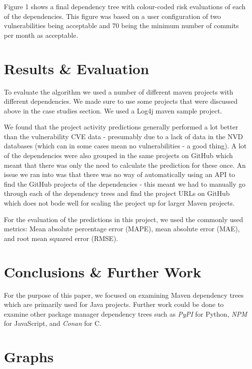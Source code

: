 \documentclass[10pt, compsoc, conference]{IEEEtran}
\begin{document}
Figure 1 shows a final dependency tree with colour-coded risk evaluations of each of the dependencies. This figure was based on a user configuration of two vulnerabilities being acceptable and 70 being the minimum number of commits per month as acceptable. 


\section{Results \& Evaluation}
To evaluate the algorithm we used a number of different maven projects with different dependencies. We made sure to use some projects that were discussed above in the case studies section. We used a Log4j maven sample project. 

We found that the project activity predictions generally performed a lot better than the vulnerability CVE data - presumably due to a lack of data in the NVD databases (which can in some cases mean no vulnerabilities - a good thing). A lot of the dependencies were also grouped in the same projects on GitHub which meant that there was only the need to calculate the prediction for these once. An issue we ran into was that there was no way of automatically using an API to find the GitHub projects of the dependencies - this meant we had to manually go through each of the dependency trees and find the project URLs on GitHub which does not bode well for scaling the project up for larger Maven projects. 

For the evaluation of the predictions in this project, we used the commonly used metrics: Mean absolute percentage error (MAPE), mean absolute error (MAE), and root mean squared error (RMSE). 

\section{Conclusions \& Further Work}
For the purpose of this paper, we focused on examining Maven dependency trees which are primarily used for Java projects. Further work could be done to examine other package manager dependency trees such as \textit{PyPI} for Python, \textit{NPM} for JavaScript, and \textit{Conan} for C. 

\printbibliography

\appendices
\section{Graphs}

\ifCLASSOPTIONcaptionsoff
  \newpage
\fi
\end{document}
